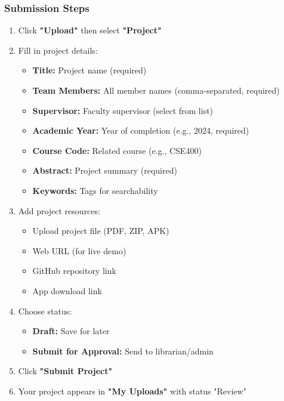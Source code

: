 \documentclass[12pt,a4paper]{article}
\begin{document}
\subsubsection{Submission Steps}
\begin{enumerate}[leftmargin=*]
    \item Click \textbf{"Upload"} then select \textbf{"Project"}
    \item Fill in project details:
        \begin{itemize}
            \item \textbf{Title:} Project name (required)
            \item \textbf{Team Members:} All member names (comma-separated, required)
            \item \textbf{Supervisor:} Faculty supervisor (select from list)
            \item \textbf{Academic Year:} Year of completion (e.g., 2024, required)
            \item \textbf{Course Code:} Related course (e.g., CSE400)
            \item \textbf{Abstract:} Project summary (required)
            \item \textbf{Keywords:} Tags for searchability
        \end{itemize}
    \item Add project resources:
        \begin{itemize}
            \item Upload project file (PDF, ZIP, APK)
            \item Web URL (for live demo)
            \item GitHub repository link
            \item App download link
        \end{itemize}
    \item Choose status:
        \begin{itemize}
            \item \textbf{Draft:} Save for later
            \item \textbf{Submit for Approval:} Send to librarian/admin
        \end{itemize}
    \item Click \textbf{"Submit Project"}
    \item Your project appears in \textbf{"My Uploads"} with status "Review"
\end{enumerate}

\newpage
\end{document}

